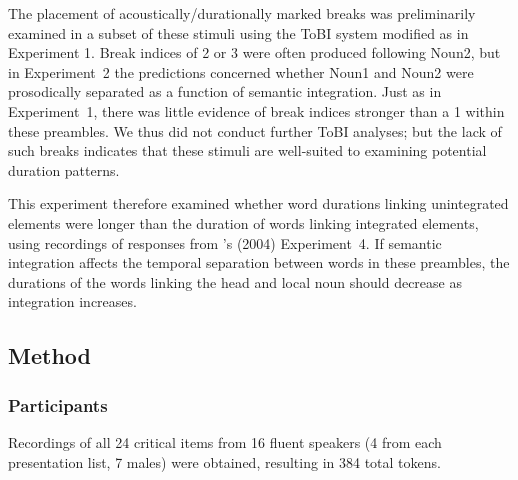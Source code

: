\documentclass[12pt,titlepage]{article}
\newcommand{\IGNORE}[1]{} %
\begin{document}
The placement of acoustically/durationally marked breaks was preliminarily examined in a subset of these stimuli using the ToBI system \cite{TOBI} modified as in Experiment 1. Break indices of 2 or 3 were often produced following Noun2, but in Experiment~2 the predictions concerned whether Noun1 and Noun2  were prosodically separated as a function of semantic integration. Just as in Experiment~1, there was little evidence of break indices stronger than a 1 within these preambles.  We thus did not conduct further ToBI analyses; but the lack of such breaks indicates that these stimuli are well-suited to examining potential duration patterns.

This experiment therefore examined whether word durations linking unintegrated elements were longer than the duration of words linking integrated elements, using recordings of responses from \citeauthor{SolomonPearlmutter04}'s (2004) Experiment~4. If semantic integration affects the temporal separation between words in these preambles, the durations of the words linking the head and local noun should decrease as integration increases.


\IGNORE{As in Experiment~1, three types of control predictors were included in the models : (1) speech rate, (2) phonological context, and (3) predictability/accessibility.  The exact controls included in each model are shown in Table~\ref{PredictorTable} and described in detail below. }


\subsection{Method}

\subsubsection{Participants} Recordings of all 24 critical items from 16 fluent speakers (4 from each presentation list, 7 males) were obtained, resulting in 384 total tokens.
\end{document}
